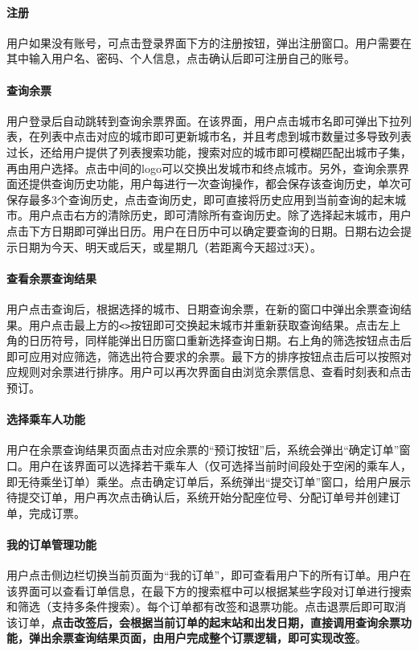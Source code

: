\documentclass{article}
\begin{document}
	
	\paragraph{注册} 用户如果没有账号，可点击登录界面下方的注册按钮，弹出注册窗口。用户需要在其中输入用户名、密码、个人信息，点击确认后即可注册自己的账号。
	
	
	\paragraph{查询余票} 用户登录后自动跳转到查询余票界面。在该界面，用户点击城市名即可弹出下拉列表，在列表中点击对应的城市即可更新城市名，并且考虑到城市数量过多导致列表过长，还给用户提供了列表搜索功能，搜索对应的城市即可模糊匹配出城市子集，再由用户选择。点击中间的logo可以交换出发城市和终点城市。另外，查询余票界面还提供查询历史功能，用户每进行一次查询操作，都会保存该查询历史，单次可保存最多3个查询历史，点击查询历史，即可直接将历史应用到当前查询的起末城市。用户点击右方的清除历史，即可清除所有查询历史。除了选择起末城市，用户点击下方日期即可弹出日历。用户在日历中可以确定要查询的日期。日期右边会提示日期为今天、明天或后天，或星期几（若距离今天超过3天）。
	
	\paragraph{查看余票查询结果} 用户点击查询后，根据选择的城市、日期查询余票，在新的窗口中弹出余票查询结果。用户点击最上方的\texttt{<>}按钮即可交换起末城市并重新获取查询结果。点击左上角的日历符号，同样能弹出日历窗口重新选择查询日期。右上角的筛选按钮点击后即可应用对应筛选，筛选出符合要求的余票。最下方的排序按钮点击后可以按照对应规则对余票进行排序。用户可以再次界面自由浏览余票信息、查看时刻表和点击预订。
	
	
	
	\paragraph{选择乘车人功能} 用户在余票查询结果页面点击对应余票的“预订按钮”后，系统会弹出“确定订单”窗口。用户在该界面可以选择若干乘车人（仅可选择当前时间段处于空闲的乘车人，即无待乘坐订单）乘坐。点击确定订单后，系统弹出“提交订单”窗口，给用户展示待提交订单，用户再次点击确认后，系统开始分配座位号、分配订单号并创建订单，完成订票。
	
	
	
	\paragraph{我的订单管理功能} 用户点击侧边栏切换当前页面为“我的订单”，即可查看用户下的所有订单。用户在该界面可以查看订单信息，在最下方的搜索框中可以根据某些字段对订单进行搜索和筛选（支持多条件搜索）。每个订单都有改签和退票功能。点击退票后即可取消该订单，\textbf{点击改签后，会根据当前订单的起末站和出发日期，直接调用查询余票功能，弹出余票查询结果页面，由用户完成整个订票逻辑，即可实现改签}。
	
\end{document}

